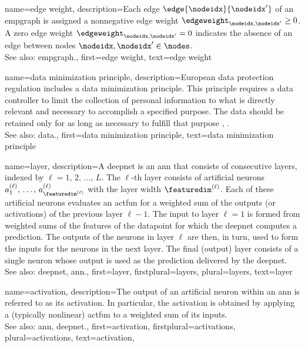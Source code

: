 {name={edge weight},
	description={Each edge $\edge{\nodeidx}{\nodeidx'}$ of an \gls{empgraph} is 
		assigned a nonnegative edge weight $\edgeweight_{\nodeidx,\nodeidx'}\geq0$. 
		A zero edge weight $\edgeweight_{\nodeidx,\nodeidx'}=0$ indicates the absence 
		of an edge between nodes $\nodeidx, \nodeidx' \in \nodes$.
				\\
		See also: \gls{empgraph}.}, 
	first={edge weight},
	text={edge weight}
}


{name={data minimization principle},
	description={European \gls{data} protection regulation 
		includes a \gls{data} minimization principle. This principle requires a \gls{data} controller to 
		limit the collection of personal information to what is directly relevant and necessary 
		to accomplish a specified purpose. The \gls{data} should be retained only for as long as 
		necessary to fulfill that purpose \cite[Article 5(1)(c)]{GDPR2016}, \cite{EURegulation2018}.
				\\
		See also: \gls{data}.}, 
	first={data minimization principle},
	text={data minimization principle}
}

{name={layer},
	description={A \gls{deepnet} is an \gls{ann} that consists of consecutive 
	    layers, indexed by $\ell=1,\,2,\,\ldots,\,L$. The $\ell$-th layer consists of 
		artificial neurons $a^{(\ell)}_{1},\,\ldots,\,a^{(\ell)}_{\featuredim^{(\ell)}}$ with 
		the layer width $\featuredim^{(\ell)}$. Each of these artificial neurons evaluates 
		an \gls{actfun} for a weighted sum of the outputs (or \glspl{activation}) of the 
		previous layer $\ell-1$. The input to layer $\ell=1$ is formed from weighted sums 
		of the \glspl{feature} of the \gls{datapoint} for which the \gls{deepnet} computes 
		a \gls{prediction}. The outputs of the neurons in layer $\ell$ are then, in turn, 
		used to form the inputs for the neurons in the next layer. The final (output) layer 
		consists of a single neuron whose 
		output is used as the \gls{prediction} delivered by the \gls{deepnet}.  
		\\
		See also: \gls{deepnet}, \gls{ann}.}, 
	first={layer},
	firstplural={layers},
	plural={layers}, 
	text={layer}
}


{name={activation},
	description={The output  of an artificial neuron within an \gls{ann} is referred 
		to as its activation. In particular, the activation is obtained by applying a (typically nonlinear) \gls{actfun} 
		to a weighted sum of its inputs.
		\\
		See also: \gls{ann}, \gls{deepnet}.}, 
	first={activation},
	firstplural={activations},
	plural={activations}, 
	text={activation}, 
}

